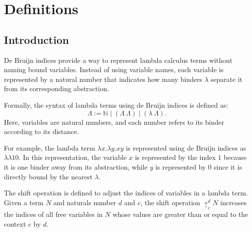 %
\chapter{Definitions}

\section{Introduction}

De Bruijn indices provide a way to represent lambda calculus terms without naming bound variables.
Instead of using variable names, each variable is represented by a natural number that indicates how many binders \( \lambda \) separate it from its corresponding abstraction.

\begin{definition}
  \label{def:Lambda}
  \leanok
  Formally, the syntax of lambda terms using de Bruijn indices is defined as:
  \[
    \Lambda := \mathbb{N} \mid (\Lambda\ \Lambda) \mid (\lambda\ \Lambda).
  \]
  Here, variables are natural numbers, and each number refers to its binder according to its distance.
\end{definition}

\begin{example}
  For example, the lambda term \( \lambda x. \lambda y. x y \) is represented using de Bruijn indices as \( \lambda \lambda 1 0 \).
  In this representation, the variable \( x \) is represented by the index \( 1 \) because it is one binder away from its abstraction, while \( y \) is represented by \( 0 \) since it is directly bound by the nearest \( \lambda \).
\end{example}

The shift operation is defined to adjust the indices of variables in a lambda term.
Given a term \( N \) and naturals number \( d \) and \( c \), the shift operation \( \uparrow_c^d N \)
increases the indices of all free variables in \( N \) whose values are greater than or equal to the
context \( c \) by \( d \).

